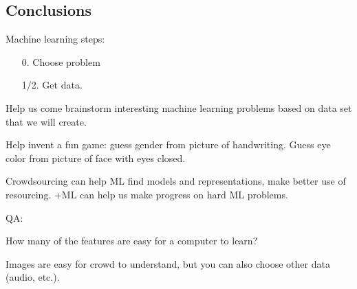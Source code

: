 \subsection{Conclusions}

Machine learning steps:
\begin{enumerate}
\item[0.] Choose problem
\item[1/2.] Get data.
\end{enumerate}

Help us come brainstorm interesting machine learning problems based on data set that we will create.

Help invent a fun game: guess gender from picture of handwriting. 
Guess eye color from picture of face with eyes closed.

Crowdsourcing can help ML find models and representations, make better use of resourcing. +ML can help us make progress on hard ML problems.

QA:

How many of the features are easy for a computer to learn?

Images are easy for crowd to understand, but you can also choose other data (audio, etc.).